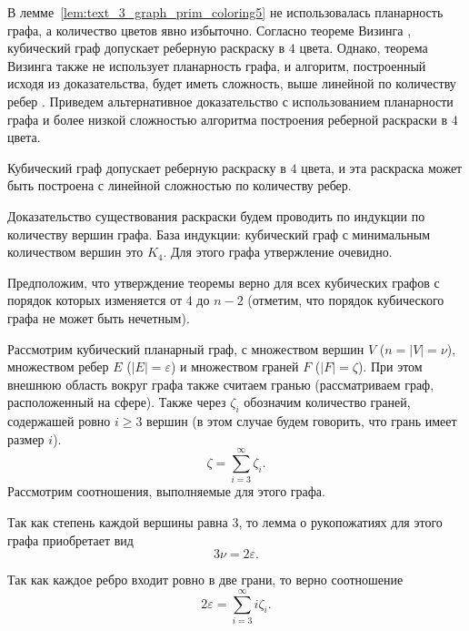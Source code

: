 В лемме~\ref{lem:text_3_graph_prim_coloring5} не использовалась планарность графа, а количество цветов явно избыточно.
Согласно теореме Визинга \cite{Vizing1964}, \cite{Vizing1965} кубический граф допускает реберную раскраску в $4$ цвета.
Однако, теорема Визинга также не использует планарность графа, и алгоритм, построенный исходя из доказательства, будет иметь сложность, выше линейной по количеству ребер \cite{Soifer2009}.
Приведем альтернативное доказательство с использованием планарности графа и более низкой сложностью алгоритма построения реберной раскраски в $4$ цвета.

\begin{lemma}\label{lem:text_3_graph_prim_coloring4}
Кубический граф допускает реберную раскраску в $4$ цвета, и эта раскраска может быть построена с линейной сложностью по количеству ребер.
\end{lemma}

Доказательство существования раскраски будем проводить по индукции по количеству вершин графа.
База индукции: кубический граф с минимальным количеством вершин это $K_4$.
Для этого графа утвержление очевидно.

Предположим, что утверждение теоремы верно для всех кубических графов с порядок которых изменяется от $4$ до $n - 2$ (отметим, что порядок кубического графа не может быть нечетным).

Рассмотрим кубический планарный граф, с множеством вершин $V$ ($n = |V| = \nu$), множеством ребер $E$ ($|E| = \varepsilon$) и множеством граней $F$ ($|F| = \zeta$).
При этом внешнюю область вокруг графа также считаем гранью (рассматриваем граф, расположенный на сфере).
Также через $\zeta_i$ обозначим количество граней, содержашей ровно $i \ge 3$ вершин (в этом случае будем говорить, что грань имеет размер $i$).
\begin{equation}
	\zeta = \sum_{i = 3}^{\infty}{\zeta_i}.
\end{equation}
Рассмотрим соотношения, выполняемые для этого графа.

Так как степень каждой вершины равна $3$, то лемма о рукопожатиях для этого графа приобретает вид
\begin{equation}
	3 \nu = 2 \varepsilon.
\end{equation}

Так как каждое ребро входит ровно в две грани, то верно соотношение
\begin{equation}
	2 \varepsilon = \sum_{i = 3}^{\infty}{i \zeta_i}.
\end{equation}

